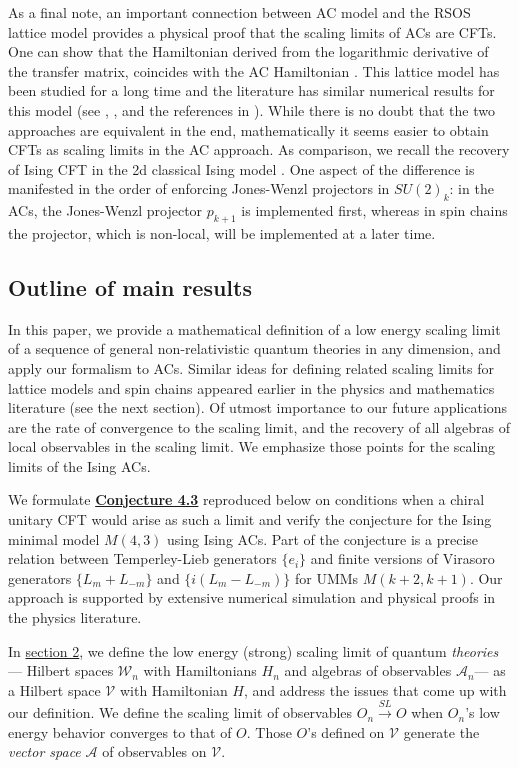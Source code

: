 \documentclass[twoside,11pt,titlepage]{amsart}
\renewcommand{\=}[1]{\stackrel{#1}{=}} %
\theoremstyle{definition}
\theoremstyle{remark}
\begin{document}
As a final note, an important connection between AC model and the RSOS lattice model provides a physical proof that the scaling limits of ACs are CFTs. One can show that the Hamiltonian derived from the logarithmic derivative of the transfer matrix, coincides with the AC Hamiltonian \cite{feiguin2007interacting}. This lattice model has been studied for a long time and the literature has similar numerical results for this model (see \cite{baxter2016exactly}, \cite{jones03}, and the references in \cite{feiguin2007interacting}).  While there is no doubt that the two approaches are equivalent in the end, mathematically it seems easier to obtain CFTs as scaling limits in the AC approach.  As comparison, we recall the recovery of Ising CFT in the 2d classical Ising model \cite{smirnov07}.  One aspect of the difference is manifested in the order of enforcing Jones-Wenzl projectors in $SU(2)_k$:  in the ACs, the Jones-Wenzl projector $p_{k+1}$ is implemented first, whereas in spin chains the projector, which is non-local, will be implemented at a later time.

\subsection{Outline of main results}\label{1.5}

\hfill \break
In this paper, we provide a mathematical definition of a low energy scaling limit of a sequence of general non-relativistic quantum theories in any dimension, and apply our formalism to ACs.  Similar ideas for defining related scaling limits for lattice models and spin chains appeared earlier in the physics and mathematics literature (see the next section).  Of utmost importance to our future applications are the rate of convergence to the scaling limit, and the recovery of all algebras of local observables in the scaling limit.  We emphasize those points for the scaling limits of the Ising ACs. 

We formulate \hyperref[cnj4.3rep]{\textbf{Conjecture 4.3}} reproduced below on conditions when a chiral unitary CFT would arise as such a limit and verify the conjecture for the Ising minimal model $M(4,3)$ using Ising ACs.  Part of the conjecture is a precise relation between Temperley-Lieb generators $\{e_i\}$ and finite versions of Virasoro generators $\{L_m+L_{-m}\}$ and $\{i(L_m-L_{-m})\}$ for UMMs $M(k+2,k+1)$.  Our approach is supported by extensive numerical simulation and physical proofs in the physics literature.

In \hyperref[2.]{section 2}, we define the low energy (strong) scaling limit of quantum \textit{theories} --- Hilbert spaces $\mathcal{W}_n$ with Hamiltonians $H_n$ and algebras of observables $\mathcal{A}_n$--- as a Hilbert space ${\mathcal{V}}$ with Hamiltonian $H$, and address the issues that come up with our definition. We define the scaling limit of observables $O_n \xrightarrow{SL} O$ when $O_n$'s low energy behavior converges to that of $O$.  Those $O$'s defined on $\mathcal{V}$ generate the \textit{vector space} $\mathcal{A}$ of observables on $\mathcal{V}$.
\end{document}
